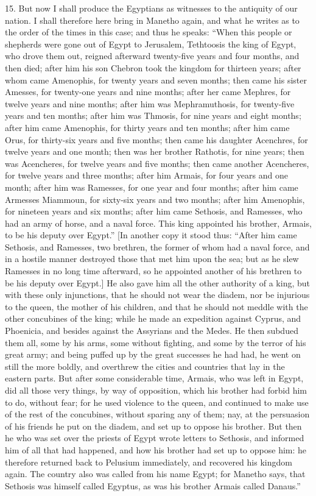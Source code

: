 15. But now I shall produce the Egyptians as witnesses to the antiquity of
our nation. I shall therefore here bring in Manetho again, and what he
writes as to the order of the times in this case; and thus he speaks:
``When this people or shepherds were gone out of Egypt to Jerusalem,
Tethtoosis the king of Egypt, who drove them out, reigned afterward
twenty-five years and four months, and then died; after him his son
Chebron took the kingdom for thirteen years; after whom came Amenophis,
for twenty years and seven months; then came his sister Amesses, for
twenty-one years and nine months; after her came Mephres, for twelve years
and nine months; after him was Mephramuthosis, for twenty-five years and
ten months; after him was Thmosis, for nine years and eight months; after
him came Amenophis, for thirty years and ten months; after him came Orus,
for thirty-six years and five months; then came his daughter Acenchres,
for twelve years and one month; then was her brother Rathotis, for nine
years; then was Acencheres, for twelve years and five months; then came
another Acencheres, for twelve years and three months; after him Armais,
for four years and one month; after him was Ramesses, for one year and
four months; after him came Armesses Miammoun, for sixty-six years and two
months; after him Amenophis, for nineteen years and six months; after him
came Sethosis, and Ramesses, who had an army of horse, and a naval force.
This king appointed his brother, Armais, to be his deputy over Egypt.'' [In
another copy it stood thus: ``After him came Sethosis, and Ramesses, two
brethren, the former of whom had a naval force, and in a hostile manner
destroyed those that met him upon the sea; but as he slew Ramesses in no
long time afterward, so he appointed another of his brethren to be his
deputy over Egypt.] He also gave him all the other authority of a king,
but with these only injunctions, that he should not wear the diadem, nor
be injurious to the queen, the mother of his children, and that he should
not meddle with the other concubines of the king; while he made an
expedition against Cyprus, and Phoenicia, and besides against the
Assyrians and the Medes. He then subdued them all, some by his arms, some
without fighting, and some by the terror of his great army; and being
puffed up by the great successes he had had, he went on still the more
boldly, and overthrew the cities and countries that lay in the eastern
parts. But after some considerable time, Armais, who was left in Egypt,
did all those very things, by way of opposition, which his brother had
forbid him to do, without fear; for he used violence to the queen, and
continued to make use of the rest of the concubines, without sparing any
of them; nay, at the persuasion of his friends he put on the diadem, and
set up to oppose his brother. But then he who was set over the priests of
Egypt wrote letters to Sethosis, and informed him of all that had
happened, and how his brother had set up to oppose him: he therefore
returned back to Pelusium immediately, and recovered his kingdom again.
The country also was called from his name Egypt; for Manetho says, that
Sethosis was himself called Egyptus, as was his brother Armais called
Danaus.''

